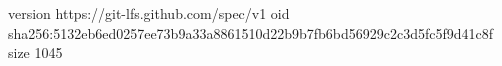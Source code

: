 version https://git-lfs.github.com/spec/v1
oid sha256:5132eb6ed0257ee73b9a33a8861510d22b9b7fb6bd56929c2c3d5fc5f9d41c8f
size 1045
